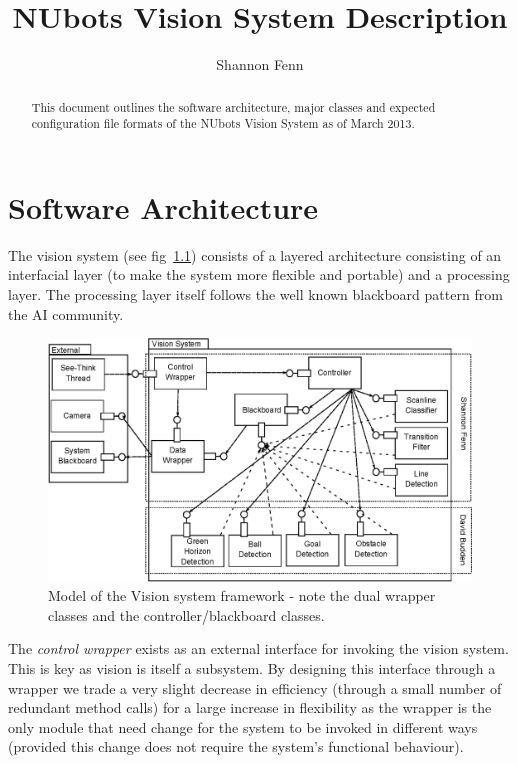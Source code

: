 \documentclass[]{report}
\title{NUbots Vision System Description}
\author{Shannon Fenn}
\begin{document}
\maketitle

\begin{abstract}
This document outlines the software architecture, major classes and expected configuration file formats of the NUbots Vision System as of March 2013.
\end{abstract}
\chapter{Software Architecture}
The vision system (see fig~\ref{fig:visionarchitecturefinal}) consists of a layered architecture consisting of an interfacial layer (to make the system more flexible and portable) and a processing layer. The processing layer itself follows the well known blackboard pattern from the AI community.

\begin{figure}[!htbp]
\centering
\vspace{2mm}
\includegraphics[scale=0.7,angle=0]{visionarchitecturefinal.eps}
\caption{\footnotesize Model of the Vision system framework - note the dual wrapper classes and the controller/blackboard classes. \normalsize}
\label{fig:visionarchitecturefinal}
\end{figure}

The \emph{control wrapper} exists as an external interface for invoking the vision system. This is key as vision is itself a subsystem. By designing this interface through a wrapper we trade a very slight decrease in efficiency (through a small number of redundant method calls) for a large increase in flexibility as the wrapper is the only module that need change for the system to be invoked in different ways (provided this change does not require the system's functional behaviour).
\end{document}
